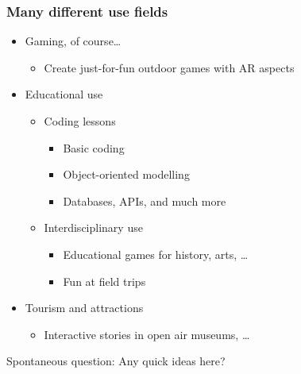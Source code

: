 \documentclass[aspectratio=43]{beamer}
\begin{document}
 \begin{frame}
  \frametitle{Many different use fields}

  \begin{itemize}
   \item{Gaming, of course…
    \begin{itemize}
     \item{Create just-for-fun outdoor games with AR aspects}
    \end{itemize}
   }
   \item{Educational use
    \begin{itemize}
     \item{Coding lessons
      \begin{itemize}
       \item{Basic coding}
       \item{Object-oriented modelling}
       \item{Databases, APIs, and much more}
      \end{itemize}
     }
     \item{Interdisciplinary use
      \begin{itemize}
       \item{Educational games for history, arts, …}
       \item{Fun at field trips}
      \end{itemize}
     }
    \end{itemize}
   }
   \item{Tourism and attractions
    \begin{itemize}
     \item{Interactive stories in open air museums, …}
    \end{itemize}
   }
  \end{itemize}
 \end{frame}


 \begin{frame}
  \Large
  Spontaneous question: Any quick ideas here?
 \end{frame}
\end{document}
